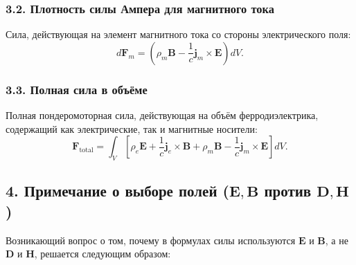 \documentclass[a4paper,12pt]{article}
\begin{document}
\subsubsection*{3.2. Плотность силы Ампера для магнитного тока}
Сила, действующая на элемент магнитного тока со стороны электрического поля:
\begin{equation}
    d\mathbf{F}_m = \left( \rho_m \mathbf{B} - \frac{1}{c} \mathbf{j}_m \times \mathbf{E} \right) dV.
    \label{eq:force_density_mag}
\end{equation}

\subsubsection*{3.3. Полная сила в объёме}
Полная пондеромоторная сила, действующая на объём ферродиэлектрика, содержащий как электрические, так и магнитные носители:
\begin{equation}
    \mathbf{F}_{\text{total}} = \int_V \left[
        \rho_e \mathbf{E} + \frac{1}{c}\mathbf{j}_e \times \mathbf{B} +
        \rho_m \mathbf{B} - \frac{1}{c} \mathbf{j}_m \times \mathbf{E}
    \right] dV.
    \label{eq:total_force}
\end{equation}

\subsection*{4. Примечание о выборе полей ($\mathbf{E}, \mathbf{B}$ против $\mathbf{D}, \mathbf{H}$)}

Возникающий вопрос о том, почему в формулах силы используются $\mathbf{E}$ и $\mathbf{B}$, а не $\mathbf{D}$ и $\mathbf{H}$, решается следующим образом:
\end{document}
